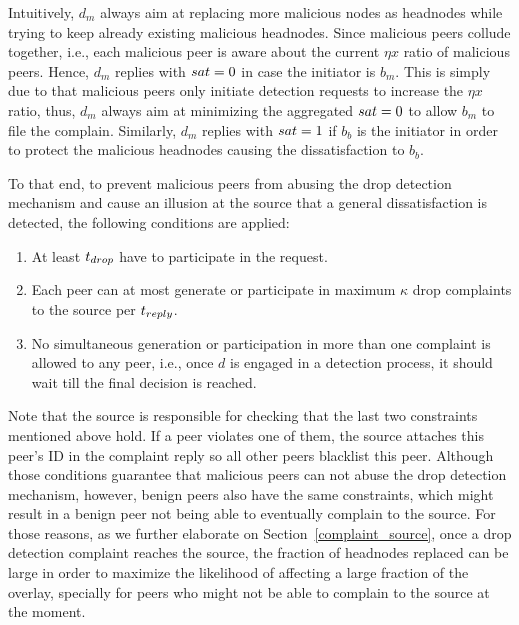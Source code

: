 Intuitively, $d_m$ always aim at replacing more malicious nodes as headnodes while trying to keep already existing malicious headnodes.
Since malicious peers collude together, i.e., each malicious peer is aware about the current $\eta x$ ratio of malicious peers.
Hence, $d_m$ replies with $sat=0$ in case the initiator is $b_m$. 
This is simply due to that malicious peers only initiate detection requests to increase the $\eta x$ ratio, thus, $d_m$ always aim at minimizing the aggregated $sat=0$ to allow $b_m$ to file the complain.
Similarly, $d_m$ replies with $sat=1$ if $b_b$ is the initiator in order to protect the malicious headnodes causing the dissatisfaction to $b_b$.


To that end, to prevent malicious peers from abusing the drop detection mechanism and cause an illusion at the source that a general dissatisfaction is detected, the following conditions are applied:
\begin{enumerate}
\item At least $t_{drop}$ have to participate in the request. 
 \item Each peer can at most generate or participate in maximum $\kappa$ drop complaints to the source per $t_{reply}$.
 \item No simultaneous generation or participation in more than one complaint is allowed to any peer, i.e., once $d$ is engaged in a detection process, it should wait till the final decision is reached.
\end{enumerate}
Note that the source is responsible for checking that the last two constraints mentioned above hold.
If a peer violates one of them, the source attaches this peer's ID in the complaint reply so all other peers blacklist this peer.
 Although those conditions guarantee that malicious peers can not abuse the drop detection mechanism,
however, benign peers also have the same constraints, which might result in a benign peer not being able to eventually complain to the source.
For those reasons, as we further elaborate on Section~\ref{complaint_source}, once a drop detection complaint reaches the source,
the fraction of headnodes replaced can be large in order to maximize the likelihood of affecting a large fraction of the overlay, specially for peers who might not be able to complain to the source at the moment.


